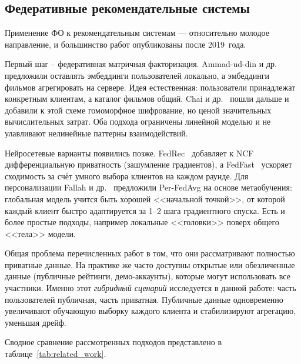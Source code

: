 \documentclass[14pt,a4paper]{extarticle}
\begin{document}
\subsection{Федеративные рекомендательные системы}

Применение ФО к рекомендательным системам --- относительно молодое направление, и большинство работ опубликованы после 2019~года.

Первый шаг -- федеративная матричная факторизация. Ammad-ud-din и др.~\cite{ammad2019federated} предложили оставлять эмбеддинги пользователей локально, а эмбеддинги фильмов агрегировать на сервере. Идея естественная: пользователи принадлежат конкретным клиентам, а каталог фильмов общий. Chai и др.~\cite{chai2020secure} пошли дальше и добавили к этой схеме гомоморфное шифрование, но ценой значительных вычислительных затрат. Оба подхода ограничены линейной моделью и не улавливают нелинейные паттерны взаимодействий.

Нейросетевые варианты появились позже. FedRec~\cite{lin2020fedrec} добавляет к NCF дифференциальную приватность (зашумление градиентов), а FedFast~\cite{muhammad2020fedfast} ускоряет сходимость за счёт умного выбора клиентов на каждом раунде. Для персонализации Fallah и др.~\cite{fallah2020personalized} предложили Per-FedAvg на основе метаобучения: глобальная модель учится быть хорошей <<начальной точкой>>, от которой каждый клиент быстро адаптируется за 1--2 шага градиентного спуска. Есть и более простые подходы, например локальные <<головки>> поверх общего <<тела>> модели.

Общая проблема перечисленных работ в том, что они рассматривают полностью приватные данные. На практике же часто доступны открытые или обезличенные данные (публичные рейтинги, демо-аккаунты), которые могут использовать все участники. Именно этот \textit{гибридный сценарий} исследуется в данной работе: часть пользователей публичная, часть приватная. Публичные данные одновременно увеличивают обучающую выборку каждого клиента и стабилизируют агрегацию, уменьшая дрейф.

Сводное сравнение рассмотренных подходов представлено в таблице~\ref{tab:related_work}.
\end{document}
